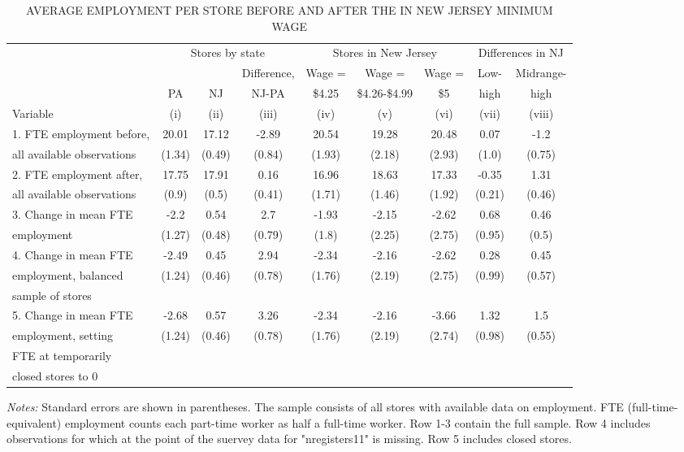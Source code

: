 \documentclass[11pt]{article}
\begin{document}
\begin{center}
	{	
	\begin{table}[ht]	
		\centering
		\caption{AVERAGE EMPLOYMENT PER STORE BEFORE AND AFTER THE IN NEW JERSEY MINIMUM WAGE}\label{t_main}
		\setlength{\tabcolsep}{2.5pt}
		\begin{tabular}{lcccccccc}
			\toprule \toprule
			& \multicolumn{3}{c}{Stores by state} & \multicolumn{3}{c}{Stores in New Jersey} &  \multicolumn{2}{c}{Differences in NJ}   \\
			\cmidrule(lr){2-4} \cmidrule(lr){5-7} \cmidrule(lr){8-9}
			&   &   & Difference, & Wage = & Wage = & Wage = & Low- & Midrange- \\
			& PA & NJ & NJ-PA & \$4.25 & \$4.26-\$4.99 & \$5 & high & high \\ 
			Variable & (i) & (ii) & (iii) & (iv) & (v) & (vi) & (vii) & (viii) \\
			\midrule
			1. FTE employment before, & 20.01 & 17.12 & -2.89 & 20.54 & 19.28 & 20.48 & 0.07 & -1.2 \\
			all available observations & (1.34) & (0.49) & (0.84) & (1.93) & (2.18) & (2.93) & (1.0) & (0.75) \\
			2. FTE employment after, & 17.75 & 17.91 & 0.16 & 16.96 & 18.63 & 17.33 & -0.35 & 1.31 \\
			all available observations  & (0.9) & (0.5) & (0.41) & (1.71) & (1.46) & (1.92) & (0.21) & (0.46) \\
			3. Change in mean FTE & -2.2 & 0.54 & 2.7 & -1.93 & -2.15 & -2.62 & 0.68 & 0.46 \\
			employment & (1.27) & (0.48) & (0.79) & (1.8) & (2.25) & (2.75) & (0.95) & (0.5) \\
			4. Change in mean FTE & -2.49 & 0.45 & 2.94 & -2.34 & -2.16 & -2.62 & 0.28 & 0.45 \\
			employment, balanced & (1.24) & (0.46) & (0.78) & (1.76) & (2.19) & (2.75) & (0.99) & (0.57) \\
			sample of stores &   &   &   &   &   &   &   &   \\
			5. Change in mean FTE & -2.68 & 0.57 & 3.26 & -2.34 & -2.16 & -3.66 & 1.32 & 1.5 \\
			employment, setting & (1.24) & (0.46) & (0.78) & (1.76) & (2.19) & (2.74) & (0.98) & (0.55) \\
			FTE at temporarily &   &   &   &   &   &   &   &   \\
			closed stores to 0 &   &   &   &   &   &   &   &   \\
			\bottomrule

		\end{tabular}
			\footnotesize \textit{Notes:} Standard errors are shown in parentheses. The sample consists of all stores with available data on employment. FTE (full-time-equivalent) employment counts each part-time worker as half a full-time worker. Row 1-3 contain the full sample. Row 4 includes observations for which at the point of the suervey data for "nregisters11" is missing. Row 5 includes closed stores.	
	\end{table}		
	}
	
\end{center}
\end{document}
